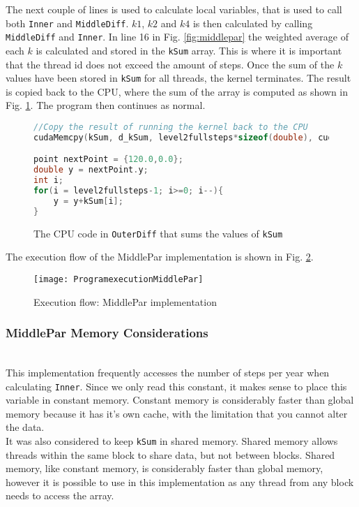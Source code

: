 The next couple of lines is used to calculate local variables, that is used to call both \texttt{Inner} and \texttt{MiddleDiff}. $k1$, $k2$ and $k4$ is then calculated by calling \texttt{MiddleDiff} and \texttt{Inner}. In line 16 in Fig. \ref{fig:middlepar} the weighted average of each $k$ is calculated and stored in the \texttt{kSum} array. This is where it is important that the thread id does not exceed the amount of steps. Once the sum of the $k$ values have been stored in \texttt{kSum} for all threads, the kernel terminates. The result is copied back to the CPU, where the sum of the array is computed as shown in Fig. \ref{fig:middleparcpu}. The program then continues as normal.

\begin{figure}[ht!]
\begin{lstlisting}[language=c]
//Copy the result of running the kernel back to the CPU
cudaMemcpy(kSum, d_kSum, level2fullsteps*sizeof(double), cudaMemcpyDeviceToHost);

point nextPoint = {120.0,0.0};
double y = nextPoint.y;
int i;
for(i = level2fullsteps-1; i>=0; i--){
	y = y+kSum[i];
}
\end{lstlisting}
\caption{The CPU code in \texttt{OuterDiff} that sums the values of \texttt{kSum}}
\label{fig:middleparcpu}
\end{figure}

The execution flow of the MiddlePar implementation is shown in Fig. \ref{fig:middleparexec}.

\begin{figure}[ht!]
  \centering
    \texttt{[image: ProgramexecutionMiddlePar]}
  \caption{Execution flow: MiddlePar implementation}
  \label{fig:middleparexec}
\end{figure}

\subsubsection{MiddlePar Memory Considerations} \hfill \\
This implementation frequently accesses the number of steps per year when calculating \texttt{Inner}. Since we only read this constant, it makes sense to place this variable in constant memory. Constant memory is considerably faster than global memory \cite{bpg} because it has it's own cache, with the limitation that you cannot alter the data.\\

It was also considered to keep \texttt{kSum} in shared memory. Shared memory allows threads within the same block to share data, but not between blocks. Shared memory, like constant memory, is considerably faster than global memory, however it is possible to use in this implementation as any thread from any block needs to access the array.


